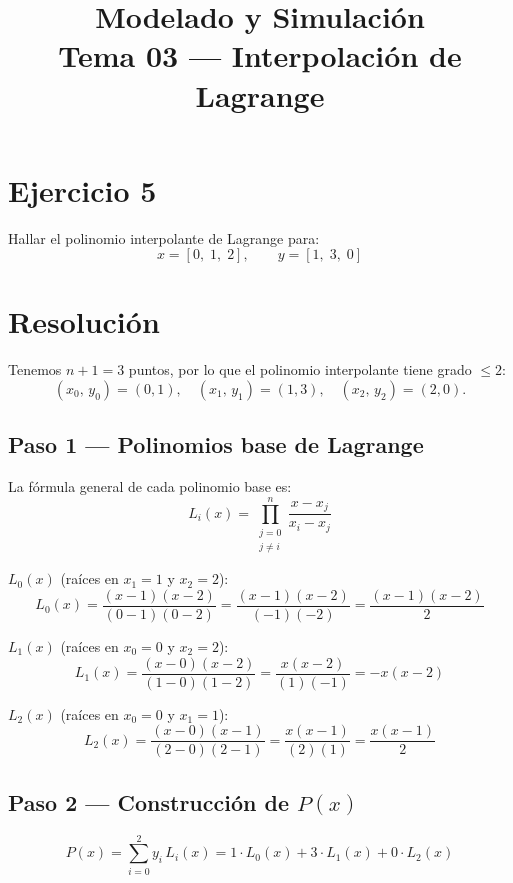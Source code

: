 \documentclass[12pt,a4paper]{article}
\title{\textbf{Modelado y Simulaci\'on}\\[0.5em]
       \large Tema 03 --- Interpolaci\'on de Lagrange}
\author{}
\date{}
\begin{document}
\maketitle
\thispagestyle{empty}

\section*{Ejercicio 5}

Hallar el polinomio interpolante de Lagrange para:
\[
  x = [0,\;1,\;2], \qquad y = [1,\;3,\;0]
\]

\section*{Resoluci\'on}

Tenemos $n+1 = 3$ puntos, por lo que el polinomio interpolante tiene grado $\leq 2$:
\[
  (x_0,\,y_0)=(0,1),\quad
  (x_1,\,y_1)=(1,3),\quad
  (x_2,\,y_2)=(2,0).
\]

\subsection*{Paso 1 \;---\; Polinomios base de Lagrange}

La f\'ormula general de cada polinomio base es:
\[
  L_i(x) = \prod_{\substack{j=0\\j\neq i}}^{n}
            \frac{x - x_j}{x_i - x_j}
\]

\textbf{$L_0(x)$} \;(ra\'ices en $x_1=1$ y $x_2=2$):
\[
  L_0(x)
    = \frac{(x-1)(x-2)}{(0-1)(0-2)}
    = \frac{(x-1)(x-2)}{(-1)(-2)}
    = \frac{(x-1)(x-2)}{2}
\]

\textbf{$L_1(x)$} \;(ra\'ices en $x_0=0$ y $x_2=2$):
\[
  L_1(x)
    = \frac{(x-0)(x-2)}{(1-0)(1-2)}
    = \frac{x(x-2)}{(1)(-1)}
    = -x(x-2)
\]

\textbf{$L_2(x)$} \;(ra\'ices en $x_0=0$ y $x_1=1$):
\[
  L_2(x)
    = \frac{(x-0)(x-1)}{(2-0)(2-1)}
    = \frac{x(x-1)}{(2)(1)}
    = \frac{x(x-1)}{2}
\]

\subsection*{Paso 2 \;---\; Construcci\'on de $P(x)$}

\[
  P(x) = \sum_{i=0}^{2} y_i\, L_i(x)
       = 1\cdot L_0(x) + 3\cdot L_1(x) + 0\cdot L_2(x)
\]
\end{document}
